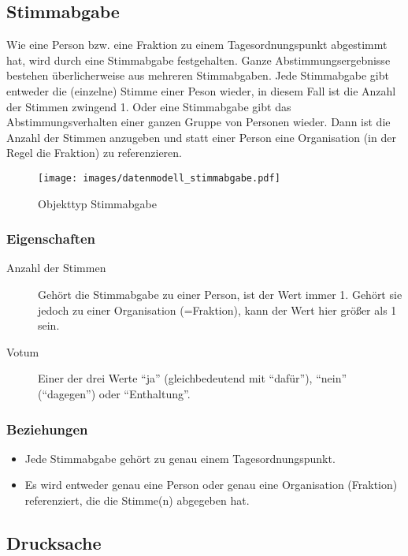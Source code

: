 \documentclass[,a4paper]{article}
\makeatletter
\def\maxwidth{\ifdim\Gin@nat@width>\linewidth\linewidth
\else\Gin@nat@width\fi}
\let\Oldincludegraphics\includegraphics
\renewcommand{\includegraphics}[1]{\Oldincludegraphics[width=\maxwidth]{#1}}
\makeatother
\begin{document}
\subsection{Stimmabgabe}

Wie eine Person bzw. eine Fraktion zu einem Tagesordnungspunkt
abgestimmt hat, wird durch eine Stimmabgabe festgehalten. Ganze
Abstimmungsergebnisse bestehen überlicherweise aus mehreren
Stimmabgaben. Jede Stimmabgabe gibt entweder die (einzelne) Stimme einer
Peson wieder, in diesem Fall ist die Anzahl der Stimmen zwingend 1. Oder
eine Stimmabgabe gibt das Abstimmungsverhalten einer ganzen Gruppe von
Personen wieder. Dann ist die Anzahl der Stimmen anzugeben und statt
einer Person eine Organisation (in der Regel die Fraktion) zu
referenzieren.

\begin{figure}[htbp]
\centering
\texttt{[image: images/datenmodell\_stimmabgabe.pdf]}
\caption{Objekttyp Stimmabgabe}
\end{figure}

\subsubsection{Eigenschaften}

\begin{description}
\item[Anzahl der Stimmen]
Gehört die Stimmabgabe zu einer Person, ist der Wert immer 1. Gehört sie
jedoch zu einer Organisation (=Fraktion), kann der Wert hier größer als
1 sein.
\item[Votum]
Einer der drei Werte ``ja'' (gleichbedeutend mit ``dafür''), ``nein''
(``dagegen'') oder ``Enthaltung''.
\end{description}

\subsubsection{Beziehungen}

\begin{itemize}
\item
  Jede Stimmabgabe gehört zu genau einem Tagesordnungspunkt.
\item
  Es wird entweder genau eine Person oder genau eine Organisation
  (Fraktion) referenziert, die die Stimme(n) abgegeben hat.
\end{itemize}

\subsection{Drucksache}
\end{document}
